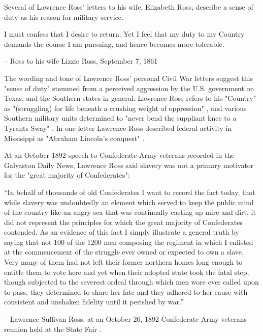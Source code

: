 \documentclass[12pt]{article}
\begin{document}
Several of Lawrence Ross' letters to his wife, Elizabeth Ross, describe a sense of duty as his reason for military service.
\begin{displayquote}
I must confess that I desire to return. Yet I feel that my duty to my Country demands the course I am pursuing, and hence becomes more tolerable. 

-- Ross to his wife Lizzie Ross, September 7, 1861 \cite[pg. 3]{sullyletters}
\end{displayquote}

The wording and tone of Lawrence Ross' personal Civil War letters suggest this "sense of duty" stemmed from a perceived aggression by the U.S. government on Texas, and the Southern states in general. Lawrence Ross refers to his "Country" as "(struggling) for life beneath a crushing weight of oppression" \cite[pg. 28]{sullyletters}, and various Southern military units determined to "never bend the suppliant knee to a Tyrants Sway" \cite[pg. 17]{sullyletters}. In one letter Lawrence Ross described federal activity in Missisippi as "Abraham Lincoln's conquest" \cite[pg. 54]{sullyletters}.

At an October 1892 speech to Confederate Army veterans recorded in the Galvaston Daily News, Lawrence Ross said slavery was not a primary motivator for the "great majority of Confederates":
\begin{displayquote}
“In behalf of thousands of old Confederates I want to record the fact today, that while slavery was undoubtedly an element which served to keep the public mind of the country like an angry sea that was continually casting up mire and dirt, it did not represent the principles for which the great majority of Confederates contended.  As an evidence of this fact I simply illustrate a general truth by saying that not 100 of the 1200 men composing the regiment in which I enlisted at the commencement of the struggle ever owned or expected to own a slave.  Very many of them had not left their former northern homes long enough to entitle them to vote here and yet when their adopted state took the fatal step, though subjected to the severest ordeal through which men wore ever called upon to pass, they determined to share her fate and they adhered to her cause with consistent and unshaken fidelity until it perished by war.” 

-- Lawrence Sullivan Ross, at an October 26, 1892 Confederate Army veterans reunion held at the State Fair \cite{gdaily:1892-10-26}.
\end{displayquote}
\end{document}
